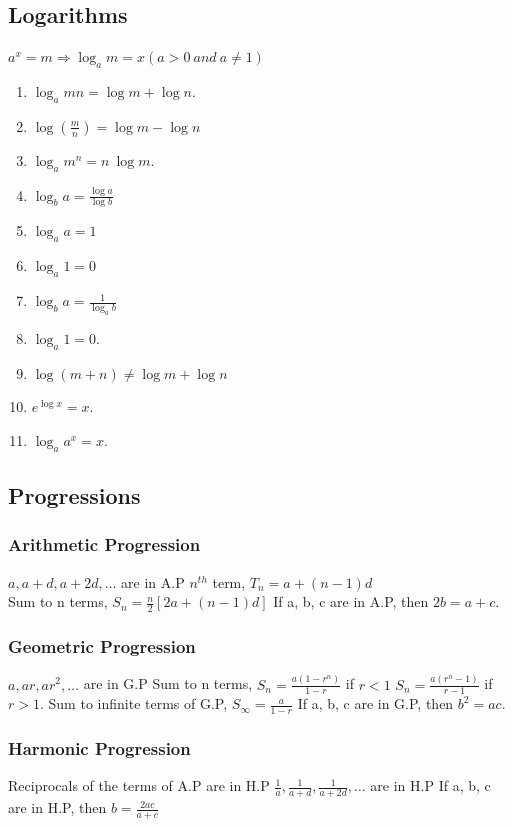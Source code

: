 \documentclass{article}
\begin{document}
\subsection*{Logarithms}
$a^{x}=m\Rightarrow \log_{a}m=x(a>0~and~a\ne1)$
\begin{enumerate}
\item $\log_{a}mn=\log m+\log n.$
\item $\log(\frac{m}{n})=\log m-\log n$
\item $\log_{a}m^{n}=n~\log m.$
\item $\log_{b}a=\frac{\log a}{\log b}$
\item $\log_{a}a=1$
\item $\log_{a}1=0$
\item $\log_{b}a=\frac{1}{\log_{a}b}$
\item $\log_{a}1=0$.
\item $\log(m+n)\ne \log m+\log n$
\item $e^{\log x}=x.$
\item $\log_{a}a^{x}=x.$
\end{enumerate}

\subsection*{Progressions}

\subsubsection*{Arithmetic Progression}
$a, a+d, a+2d, \dots$ are in A.P $n^{th}$ term, $T_{n}=a+(n-1)d$
\\Sum to n terms, $S_{n}=\frac{n}{2}[2a+(n-1)d]$
If a, b, c are in A.P, then $2b=a+c$.

\subsubsection*{Geometric Progression}
$a, ar, ar^{2}, \dots$ are in G.P
Sum to n terms, $S_{n}=\frac{a(1-r^{n})}{1-r}$ if $r<1$
$S_{n}=\frac{a(r^{n}-1)}{r-1}$ if $r>1.$
Sum to infinite terms of G.P, $S_{\infty}=\frac{a}{1-r}$
If a, b, c are in G.P, then $b^{2}=ac$.

\subsubsection*{Harmonic Progression}
Reciprocals of the terms of A.P are in H.P
$\frac{1}{a},\frac{1}{a+d},\frac{1}{a+2d},\dots$ are in H.P
If a, b, c are in H.P, then $b=\frac{2ac}{a+c}$
\end{document}
